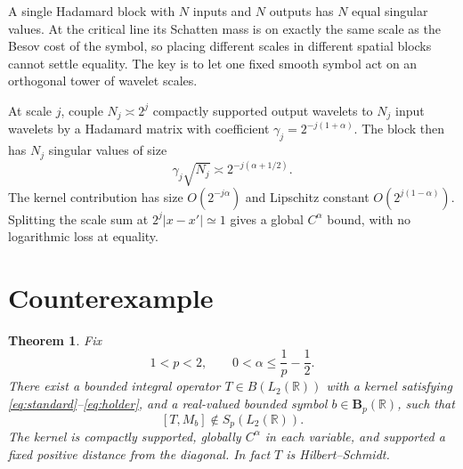 \documentclass[11pt]{article}
\newtheorem{theorem}{Theorem}
\theoremstyle{remark}
\newcommand{\R}{\mathbb R}
\newcommand{\Sp}{S_p(L_2(\mathbb R))}
\begin{document}
A single Hadamard block with $N$ inputs and $N$ outputs has $N$ equal
singular values.  At the critical line its Schatten mass is on exactly the
same scale as the Besov cost of the symbol, so placing different scales in
different spatial blocks cannot settle equality.  The key is to let one
fixed smooth symbol act on an orthogonal tower of wavelet scales.

At scale $j$, couple $N_j\asymp2^j$ compactly supported output wavelets to
$N_j$ input wavelets by a Hadamard matrix with coefficient
$\gamma_j=2^{-j(1+\alpha)}$.  The block then has $N_j$ singular values of
size
\[
                  \gamma_j\sqrt{N_j}
                  \asymp2^{-j(\alpha+1/2)}.
\]
The kernel contribution has size $O(2^{-j\alpha})$ and Lipschitz constant
$O(2^{j(1-\alpha)})$.  Splitting the scale sum at $2^j|x-x'|\simeq1$ gives a
global $C^\alpha$ bound, with no logarithmic loss at equality.

\section{Counterexample}

\begin{theorem}\label{thm:main}
Fix
\[
             1<p<2,\qquad 0<\alpha\leq\frac1p-\frac12.
\]
There exist a bounded integral operator $T\in B(L_2(\R))$ with a kernel
satisfying \eqref{eq:standard}--\eqref{eq:holder}, and a real-valued bounded
symbol $b\in\boldsymbol B_p(\R)$, such that
\[
                         [T,M_b]\notin\Sp.
\]
The kernel is compactly supported, globally $C^\alpha$ in each variable,
and supported a fixed positive distance from the diagonal.  In fact $T$ is
Hilbert--Schmidt.
\end{theorem}
\end{document}
